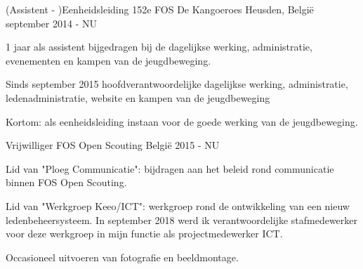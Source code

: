 


\begin{cventries}


\cventry
{(Assistent - )Eenheidsleiding} %
{152e FOS De Kangoeroes} %
{Heusden, België} %
{september 2014 - NU} %
{ %
\begin{cvitems}
\item {1 jaar als assistent bijgedragen bij de dagelijkse werking, administratie, evenementen en kampen van de jeugdbeweging.}
\item {Sinds  september 2015 hoofdverantwoordelijke dagelijkse werking, administratie, ledenadministratie, website en kampen van de jeugdbeweging}
\item {Kortom: als eenheidsleiding instaan voor de goede werking van de jeugdbeweging.}
\end{cvitems}
}

\cventry
{Vrijwilliger} %
{FOS Open Scouting} %
{België} %
{2015 - NU} %
{ %
	\begin{cvitems}
		\item {Lid van "Ploeg Communicatie": bijdragen aan het beleid rond communicatie binnen FOS Open Scouting.}
		\item {Lid van "Werkgroep Keeo/ICT": werkgroep rond de ontwikkeling van een nieuw ledenbeheersysteem. In september 2018 werd ik verantwoordelijke stafmedewerker voor deze werkgroep in mijn functie als projectmedewerker ICT.}
		\item {Occasioneel uitvoeren van fotografie en beeldmontage.}		
	\end{cvitems}
}







\end{cventries}